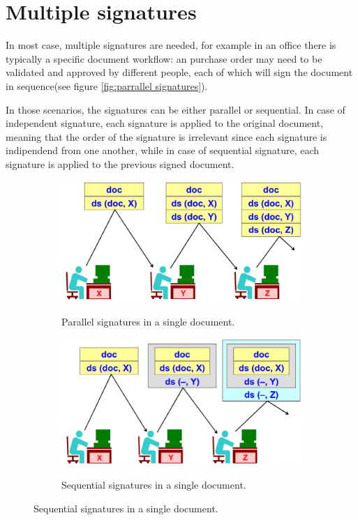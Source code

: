 \section{Multiple signatures}
In most case, multiple signatures are needed, for example in an office
there is typically a specific document workflow: an purchase order 
may need to be validated and approved by different people, each of 
which will sign the document in sequence(see figure \ref{fig:parrallel
signatures}). 

In those scenarios, the signatures can be either parallel or
sequential. In case of independent signature, each signature is applied
to the original document, meaning that the order of the signature is
irrelevant since each signature is indipendend from one another, while
in case of sequential signature, each signature is applied to the
previous signed document.
\begin{figure}[H]
  \centering
  \begin{subfigure}[b]{0.45\textwidth}
    \includegraphics[width=\textwidth]{img/paralledl signatures.png}
    \label{fig:parrallel signatures}
    \caption{Parallel signatures in a single document.}
  \end{subfigure}
  \hfill
  \begin{subfigure}[b]{0.45\textwidth}
    \includegraphics[width=\textwidth]{img/sequential signatures.png}
    \label{fig:sequential signatures}
    \caption{Sequential signatures in a single document.}
  \end{subfigure}
\end{figure}

